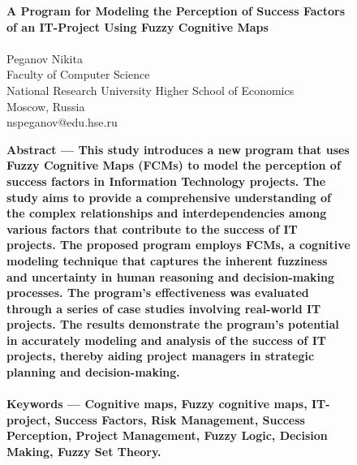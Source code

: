 \documentclass{article}
\begin{document}
    \thispagestyle{empty}
    \begin{figure}[!t]
        \begin{center}
            \fontsize{18}{20}\selectfont
            \textbf{
                A Program for Modeling the Perception of Success Factors\\
                of an IT-Project Using Fuzzy Cognitive Maps\\
            }
            ~\\
            \fontsize{14}{16}\selectfont
            Peganov Nikita\\
            Faculty of Computer Science\\
            National Research University Higher School of Economics\\
            Moscow, Russia\\
            nspeganov@edu.hse.ru\\
        \end{center}
        \fontsize{8}{7}\selectfont
        \begin{minipage}{0.49\textwidth}
            \textbf{Abstract — This study introduces a new program that uses Fuzzy Cognitive Maps (FCMs) to model the perception of success factors in Information Technology projects. The study aims to provide a comprehensive understanding of the complex relationships and interdependencies among various factors that contribute to the success of IT projects. The proposed program employs FCMs, a cognitive modeling technique that captures the inherent fuzziness and uncertainty in human reasoning and decision-making processes. The program's effectiveness was evaluated through a series of case studies involving real-world IT projects. The results demonstrate the program's potential in accurately modeling and analysis of the success of IT projects, thereby aiding project managers in strategic planning and decision-making.}\\
            ~\\
            \textbf{Keywords — Cognitive maps, Fuzzy cognitive maps, IT-project, Success Factors, Risk Management, Success Perception, Project Management, Fuzzy Logic, Decision Making, Fuzzy Set Theory.}\\
            ~\\
            \begin{center}

\end{center}
\end{minipage}
\end{figure}
\end{document}
